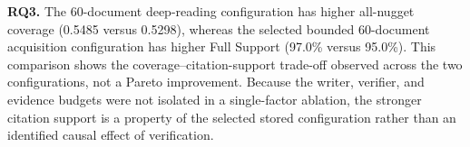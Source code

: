 \textbf{RQ3.}
The 60-document deep-reading configuration has higher all-nugget
coverage (0.5485 versus 0.5298), whereas the selected bounded
60-document acquisition configuration has higher Full Support (97.0\%
versus 95.0\%). This comparison shows the
coverage--citation-support trade-off observed across the two
configurations, not a Pareto improvement. Because the writer, verifier,
and evidence budgets were not isolated in a single-factor ablation, the
stronger citation support is a property of the selected stored
configuration rather than an identified causal effect of verification.
